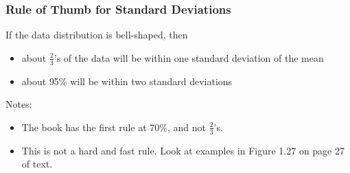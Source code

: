 \documentclass[handout]{beamer}
\newcommand{\blue}[1]{\textcolor{blue2}{#1}}
\begin{document}
\begin{frame}[fragile]
\frametitle{Rule of Thumb for Standard Deviations}

If the data distribution is bell-shaped, then 
\begin{itemize}
\item about \blue{$\frac{2}{3}$'s of the data will be within one standard deviation of the mean}
\item about \blue{95\% will be within two standard deviations}
\end{itemize}

\vspace{0.5cm}

\pause Notes:
\begin{itemize}
\pause\item The book has the first rule at 70\%, and not $\frac{2}{3}$'s.  
\pause\item This is not a hard and fast rule.  Look at examples in Figure 1.27 on page 27 of text.  
\end{itemize}

\end{frame}
\end{document}
